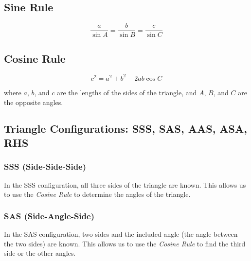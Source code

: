 \documentclass[12pt,a4paper]{article}
\begin{document}
\subsection*{Sine Rule}
\[ \frac{a}{\sin A} = \frac{b}{\sin B} = \frac{c}{\sin C} \]

\subsection*{Cosine Rule}
\[ c^2 = a^2 + b^2 - 2ab \cos C \]

\begin{center}
\end{center}
where \( a \), \( b \), and \( c \) are the lengths of the sides of the triangle, and \( A \), \( B \), and \( C \) are the opposite angles.

\subsection*{Triangle Configurations: SSS, SAS, AAS, ASA, RHS}

\subsubsection*{SSS (Side-Side-Side)}
In the SSS configuration, all three sides of the triangle are known. This allows us to use the \textit{Cosine Rule} to determine the angles of the triangle.

\subsubsection*{SAS (Side-Angle-Side)}
In the SAS configuration, two sides and the included angle (the angle between the two sides) are known. This allows us to use the \textit{Cosine Rule} to find the third side or the other angles.
\end{document}
